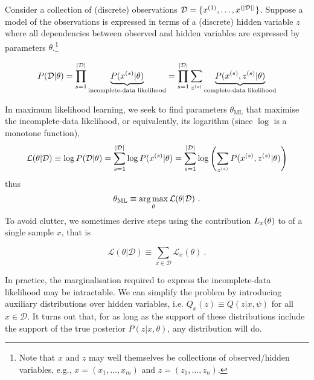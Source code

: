 
Consider a collection of (discrete) observations $\mathcal D = \{x^{(1)}, \ldots, x^{(|\mathcal D|)}\}$.
Suppose a model of the observations is expressed in terms of a (discrete) hidden variable $z$ where all dependencies between observed and hidden variables are expressed by parameters $\theta$.\footnote{Note that $x$ and $z$ may well themselves be collections of observed/hidden variables, e.g., $x = (x_1, \ldots, x_m)$ and $z = (z_1, \ldots, z_n)$.}

\begin{equation}\label{eq:incomplete-data-likelihood}
	P(\mathcal D|\theta) = \prod_{s=1}^{|\mathcal D|} \underbrace{P(x^{(s)}|\theta)}_{\text{incomplete-data likelihood}} = \prod_{s=1}^{|\mathcal D|} \sum_{z^{(s)}} \underbrace{P(x^{(s)}, z^{(s)}|\theta)}_{\text{complete-data likelihood}}
\end{equation}

In maximum likelihood learning, we seek to find parameters $\theta_{\text{ML}}$ that maximise the incomplete-data likelihood, or equivalently, its logarithm (since $\log$ is a monotone function),
\begin{equation}\label{eq:log-likelihood}
	\mathcal L(\theta|\mathcal D) \equiv \log P(\mathcal D|\theta) = \sum_{s=1}^{|\mathcal D|} \log P(x^{(s)}|\theta) = \sum_{s=1}^{|\mathcal D|} \log \left( \sum_{z^{(s)}} P(x^{(s)}, z^{(s)}|\theta) \right)
\end{equation}
\noindent thus
\begin{equation}\label{eq:MLE}
	\theta_{\text{ML}} \equiv \operatorname*{arg\,max}_\theta \mathcal L(\theta|\mathcal D) ~ .
\end{equation}
To avoid clutter, we sometimes derive steps using the contribution $\mathcal \mathcal L_x(\theta)$ to  of a single sample $x$, that is

\begin{equation}
	\mathcal L(\theta|\mathcal D) \equiv \sum_{x \in \mathcal D} \mathcal L_x(\theta) ~ .
\end{equation}

In practice, the marginalisation required to express the incomplete-data likelihood may be intractable. We can simplify the problem by introducing auxiliary distributions over hidden variables, i.e. $Q_x(z) \equiv Q(z|x, \psi)$ for all $x \in \mathcal D$.
It turns out that, for as long as the support of these distributions include the support of the true posterior $P(z|x, \theta)$, any distribution will do.

